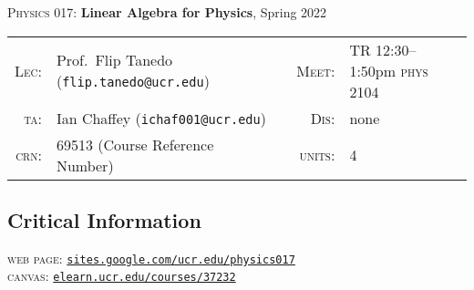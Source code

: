 \documentclass[12pt]{article}
\numberwithin{equation}{section}    %
\begin{document}
\begin{center}

    {\Large \textsc{Physics 017:} \textbf{Linear Algebra for Physics}, Spring 2022}

\end{center}


\noindent
\begin{tabular*}{\textwidth}{rlcrl}
\textsc{Lec:}& Prof.~Flip Tanedo (\texttt{flip.tanedo@ucr.edu})
&
\hspace{.5cm}
&
\textsc{Meet:} & 
TR 12:30--1:50pm \textsc{phys} 2104
\\
\textsc{ta:}& Ian Chaffey (\texttt{ichaf001@ucr.edu})
&
\hspace{.25cm}
&
\textsc{Dis:} & none
\\
\textsc{crn:} & 69513 (Course Reference Number)
&
\hspace{.25cm}
&
\textsc{units:} & 4
\end{tabular*}




\subsection*{Critical Information}
\textsc{web page:} \texttt{\href{https://sites.google.com/ucr.edu/physics017}{sites.google.com/ucr.edu/physics017}}\\
\textsc{canvas:} \texttt{\href{https://elearn.ucr.edu/courses/37232}{elearn.ucr.edu/courses/37232}}
\end{document}
